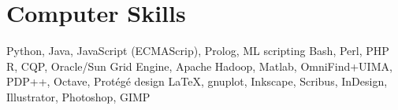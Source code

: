 \documentclass[11pt,a4paper]{moderncv}
\begin{document}
\section{Computer Skills}
        {Python, Java, JavaScript (ECMA\-Scrip), Prolog, ML}
    {scripting}
        {Bash, Perl, PHP}
        {R, CQP, Oracle/Sun Grid Engine, Apache Hadoop, Matlab, OmniFind+UIMA,
        PDP++, Octave, Prot\'{e}g\'{e}}
    {design}
        {\LaTeX, gnuplot, Inkscape, Scribus, InDesign, Illustrator, Photoshop, GIMP}%
\closesection{}





%
%
\end{document}
